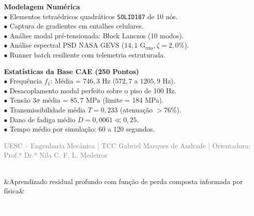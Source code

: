 \documentclass[11pt]{article}
\newcommand{\slideheader}[3]{
    \noindent
    \begin{minipage}{\textwidth}
        \colorbox{SpaceNavy}{
            \parbox{\dimexpr\textwidth-2\fboxsep\relax}{
                \vspace{0.2cm}
                \hspace{0.3cm}
                \begin{minipage}{0.85\textwidth}
                    {\Large \textbf{\textcolor{white}{#1}}}\\[0.1cm]
                    \ifx&#2&\else{\small \textbf{\textcolor{SpaceGold}{#2}}}\fi
                \end{minipage}
                \hfill
                \begin{minipage}{0.10\textwidth}
                    \raggedleft
                    {\large \textbf{\textcolor{white}{#3 / 20}}}\hspace{0.3cm}
                \end{minipage}
                \vspace{0.2cm}
            }
        }
    \end{minipage}
    \vspace{0.4cm}
}
\newcommand{\slidefooter}{
    \vfill
    \noindent
    \begin{minipage}{\textwidth}
        \centering
        \scriptsize \textcolor{gray}{UESC -- Engenharia Mecânica | TCC Gabriel Marques de Andrade | Orientadora: Prof.ª Dr.ª Nila C. F. L. Medeiros}
    \end{minipage}
}
\begin{document}
\begin{minipage}[t]{0.48\textwidth}
    \textbf{\textcolor{NavyAccent}{Modelagem Numérica}}\\[0.2cm]
    \small
    $\bullet$ Elementos tetraédricos quadráticos \texttt{SOLID187} de 10 nós.\\
    $\bullet$ Captura de gradientes em entalhes celulares.\\
    $\bullet$ Análise modal pré-tensionada: Block Lanczos (10 modos).\\
    $\bullet$ Análise espectral PSD NASA GEVS ($14{,}1\text{ G}_{\text{rms}}, \zeta = 2{,}0\%$).\\
    $\bullet$ Runner batch resiliente com telemetria estruturada.
\end{minipage}
\hfill
\begin{minipage}[t]{0.48\textwidth}
    \textbf{\textcolor{NavyAccent}{Estatísticas da Base CAE (250 Pontos)}}\\[0.2cm]
    \small
    $\bullet$ Frequência $f_1$: Média = $746{,}3\text{ Hz}$ ($572{,}7$ a $1205{,}9\text{ Hz}$).\\
    $\bullet$ Desacoplamento modal perfeito sobre o piso de 100 Hz.\\
    $\bullet$ Tensão $3\sigma$ média = $85{,}7\text{ MPa}$ (limite = 184 MPa).\\
    $\bullet$ Transmissibilidade média $T = 0{,}233$ (atenuação $> 76\%$).\\
    $\bullet$ Dano de fadiga médio $D = 0{,}0061 \ll 0{,}25$.\\
    $\bullet$ Tempo médio por simulação: 60 a 120 segundos.
\end{minipage}

\slidefooter
\clearpage

\slideheader{Metamodelo Neural: Physics-Guided ResNet}{Aprendizado residual profundo com função de perda composta informada por física}{10}
\end{document}
